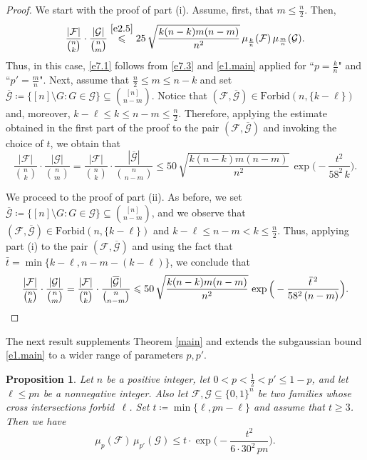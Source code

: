 \documentclass[10pt]{amsart}
\newtheorem{prop}[thm]{Proposition}
\theoremstyle{remark}
\newcommand{\meg}{\geqslant}
\newcommand{\mik}{\leqslant}
\newcommand{\Fcal}{\mathcal{F}}
\newcommand{\Gcal}{\mathcal{G}}
\begin{document}
\begin{proof}
We start with the proof of part (i). Assume, first, that $m\mik \frac{n}{2}$. Then,
\begin{equation} \label{e7.3}
\frac{|\Fcal|}{\binom{n}{k}}\cdot \frac{|\Gcal|}{\binom{n}{m}}
\stackrel{\eqref{e2.5}}{\mik} 25\, \sqrt{\frac{k(n-k)m(n-m)}{n^2}}\,
\mu_{\frac{k}{n}}(\Fcal)\, \mu_{\frac{m}{n}}(\Gcal).
\end{equation}
Thus, in this case, \eqref{e7.1} follows from \eqref{e7.3} and \eqref{e1.main} applied
for ``$p=\frac{k}{n}$" and ``$p'=\frac{m}{n}$". Next, assume that $\frac{n}{2}\mik m\mik n-k$
and set $\overline{\Gcal}\coloneqq \{[n]\setminus G: G\in\Gcal\} \subseteq \binom{[n]}{n-m}$.
Notice that $(\Fcal,\overline{\Gcal})\in\mathrm{Forbid}(n,\{k-\ell\})$ and, moreover,
$k-\ell \mik k \mik n-m \mik\frac{n}{2}$. Therefore, applying the estimate obtained in the
first part of the proof to the pair $(\Fcal,\overline{\Gcal})$ and invoking the choice of $t$,
we obtain that
\begin{equation} \label{e7.4}
\frac{|\Fcal|}{\binom{n}{k}}\cdot \frac{|\Gcal|}{\binom{n}{m}} =
\frac{|\Fcal|}{\binom{n}{k}}\cdot \frac{|\overline{\Gcal}|}{\binom{n}{n-m}}
\mik 50\, \sqrt{\frac{k(n-k)m(n-m)}{n^2}}\, \exp\Big(-\frac{t^2}{58^2\, k}\Big).
\end{equation}

We proceed to the proof of part (ii). As before, we set
$\overline{\Gcal}\coloneqq \{[n]\setminus G:G\in\Gcal\}\subseteq \binom{[n]}{n-m}$, and we observe that
$(\Fcal,\overline{\Gcal})\in\mathrm{Forbid}(n,\{k-\ell\})$ and $k-\ell\mik n-m < k\mik\frac{n}{2}$.
Thus, applying part (i) to the pair $(\Fcal,\overline{\Gcal})$ and using the fact that
$\bar{t}=\min\{k-\ell,n-m-(k-\ell)\}$, we conclude that
\begin{equation} \label{e7.5}
\frac{|\Fcal|}{\binom{n}{k}}\cdot \frac{|\Gcal|}{\binom{n}{m}} =
\frac{|\Fcal|}{\binom{n}{k}}\cdot \frac{|\overline{\Gcal}|}{\binom{n}{n-m}}
\mik 50\, \sqrt{\frac{k(n-k)m(n-m)}{n^2}}\, \exp\Big(-\frac{\bar{t}^{\, 2}}{58^2\,(n-m)}\Big). \qedhere
\end{equation}
\end{proof}
The next result supplements Theorem \ref{main} and extends the subgaussian bound \eqref{e1.main}
to a wider range of parameters $p,p'$.
\begin{prop} \label{p7.2}
Let $n$ be a positive integer, let $0<p<\frac12 < p'\mik 1-p$, and let $\ell\mik pn$ be a nonnegative integer.
Also let $\Fcal,\Gcal\subseteq \{0,1\}^n$ be two families whose cross intersections forbid\, $\ell$.
Set $t\coloneqq \min\{\ell,pn-\ell\}$ and assume that $t\meg 3$. Then we have
\begin{equation} \label{e7.6}
\mu_p(\Fcal)\, \mu_{p'}(\Gcal) \mik t\cdot\exp\Big( - \frac{t^2}{6\cdot 30^2\, pn}\Big).
\end{equation}
\end{prop}
\end{document}
